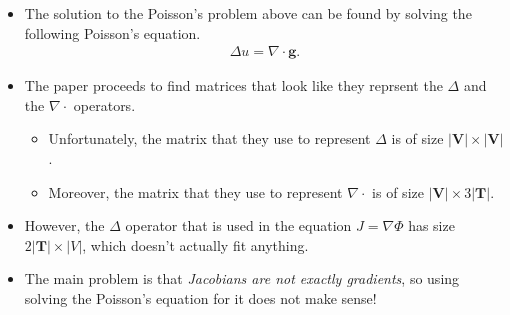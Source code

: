 \documentclass[10pt]{article}
\newcommand{\ve}[1]{\mathbf{#1}}
\begin{document}
\begin{itemize}
\begin{itemize}
        \item The solution to the Poisson's problem above can be found by solving the following Poisson's equation.
        \begin{align*}
            \Delta u = \nabla \cdot \ve{g}.
        \end{align*}

        \item The paper proceeds to find matrices that look like they reprsent the $\Delta$ and the $\nabla \cdot$ operators.
        \begin{itemize}
            \item Unfortunately, the matrix that they use to represent $\Delta$ is of size $|\ve{V}| \times |\ve{V}|$.
            \item Moreover, the matrix that they use to represent $\nabla \cdot$ is of size $|\ve{V}| \times 3|\ve{T}|$.
        \end{itemize}
        
        \item However, the $\Delta$ operator that is used in the equation $J = \nabla \Phi$ has size $2|\ve{T}| \times |V|$, which doesn't actually fit anything.
        
        \item The main problem is that \emph{Jacobians are not exactly gradients}, so using solving the Poisson's equation for it does not make sense!
    \end{itemize}

\end{itemize}



  
\end{document}
